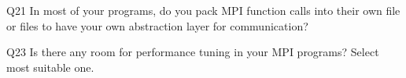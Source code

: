 \begin{description}%
\item{Q21} In most of your programs, do you pack MPI function calls into their own file or files to have your own abstraction layer for communication?%
\item{Q23} Is there any room for performance tuning in your MPI programs? Select most suitable one.%
\end{description}%
